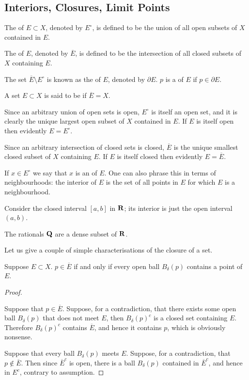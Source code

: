 \subsection{Interiors, Closures, Limit Points}
\begin{definition}
The  of $E\subset X$, denoted by $E^\circ$, is defined to be the union of all open subsets of $X$ contained in $E$.

The  of $E$, denoted by $\overline{E}$, is defined to be the intersection of all closed subsets of $X$ containing $E$.

The set $\overline{E}\setminus E^\circ$ is known as the  of $E$, denoted by $\partial E$. $p$ is a  of $E$ if $p\in\partial E$.

A set $E\subset X$ is said to be  if $\overline{E}=X$.
\end{definition}

Since an arbitrary union of open sets is open, $E^\circ$ is itself an open set, and it is clearly the unique largest open subset of $X$ contained in $E$. If $E$ is itself open then evidently $E=E^\circ$.

Since an arbitrary intersection of closed sets is closed, $\overline{E}$ is the unique smallest closed subset of $X$ containing $E$. If $E$ is itself closed then evidently $E=\overline{E}$.

If $x\in E^\circ$ we say that $x$ is an  of $E$. One can also phrase this in terms of neighbourhoods: the interior of $E$ is the set of all points in $E$ for which $E$ is a neighbourhood.

\begin{example}
Consider the closed interval $[a,b]$ in $\mathbf R$; its interior is just the open interval $(a,b)$.

The rationals $\mathbf Q$ are a dense subset of $\mathbf R$.
\end{example}

Let us give a couple of simple characterisations of the closure of a set.

\begin{proposition}
Suppose $E\subset X$. $p\in\overline{E}$ if and only if every open ball $B_\delta(p)$ contains a point of $E$.
\end{proposition}

\begin{proof} \

\fbox{$\implies$} Suppose that $p\in\overline{E}$. Suppose, for a contradiction, that there exists some open ball $B_\delta(p)$ that does not meet $E$, then $B_\delta(p)^c$ is a closed set containing $E$. Therefore $B_\delta(p)^c$ contains $\overline{E}$, and hence it contains $p$, which is obviously nonsense.

\fbox{$\impliedby$} Suppose that every ball $B_\delta(p)$ meets $E$. Suppose, for a contradiction, that $p\notin\overline{E}$. Then since $\overline{E}^c$ is open, there is a ball $B_\delta(p)$ contained in $\overline{E}^c$, and hence in $E^c$, contrary to assumption.
\end{proof}

